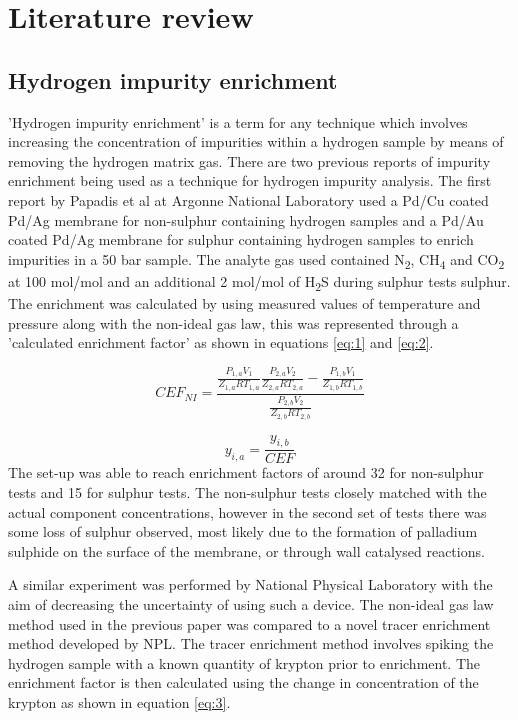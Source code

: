 
\chapter{Literature review}

\section{Hydrogen impurity enrichment}
'Hydrogen impurity enrichment' is a term for any technique which involves increasing the 
concentration of impurities within a hydrogen sample by means of removing the hydrogen matrix gas. 
There are two previous reports of impurity enrichment being used as a technique for hydrogen impurity 
analysis. 
The first report by Papadis et al at Argonne National Laboratory used a Pd/Cu \cite{Ahmed2010}
coated Pd/Ag membrane for non-sulphur containing hydrogen samples and a Pd/Au coated Pd/Ag membrane for sulphur 
containing hydrogen samples to enrich impurities in a 50 bar sample. 
The analyte gas used contained 
N\textsubscript{2}, CH\textsubscript{4} and CO\textsubscript{2} at 100 \textmu mol/mol and an additional 
 2 \textmu mol/mol of H\textsubscript{2}S during sulphur tests sulphur. 
The enrichment was calculated by using measured values of temperature and pressure along with the 
non-ideal gas law, this was represented through a 'calculated enrichment factor' as shown in equations \ref{eq:1}
and \ref{eq:2}. 

\begin{equation} \label{eq:1}
    CEF_{NI} = \frac{\frac{P_{1,a} V_1}{Z_{1,a}RT_{1,a}}\frac{P_{2,a} V_2}{Z_{2,a}RT_{2,a}}-\frac{P_{1,b} V_1}{Z_{1,b}RT_{1,b}}}{\frac{P_{2,b} V_2}{Z_{2,b}RT_{2,b}}}
\end{equation}

\begin{equation}\label{eq:2}
    y_{i,a} = \frac{y_{i,b}}{CEF}
\end{equation}
The set-up was able to reach enrichment factors of around 32 for non-sulphur tests and 15 
for sulphur tests. The non-sulphur tests closely matched with the actual component concentrations, 
however in the second set of tests there was some loss of sulphur observed, most likely due to the 
formation of palladium sulphide on the surface of the membrane, or through wall catalysed reactions. 

A similar experiment was performed by National Physical Laboratory with the aim of decreasing the uncertainty 
of using such a device. \cite{Murugan2014} The non-ideal gas law method used in the previous paper \cite{Ahmed2010} 
was compared to a novel tracer enrichment method developed by NPL. \cite{Murugan2014} 
The tracer enrichment method involves spiking the hydrogen sample with a known quantity of krypton prior to 
enrichment. The enrichment factor is then calculated using the change in concentration of the krypton as 
shown in equation \ref{eq:3}.

